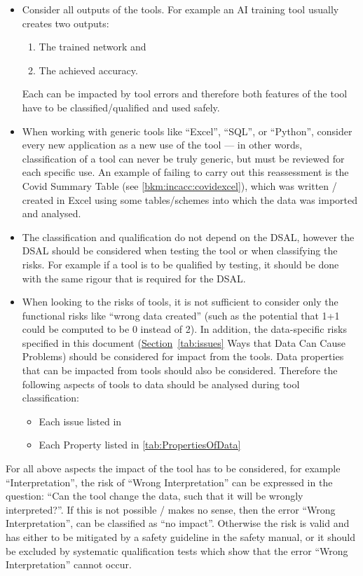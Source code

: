 \begin{itemize}
\item Consider all outputs of the tools.
  For example an AI training tool usually creates two outputs:
  \begin{enumerate}
  \item The trained network and
  \item The achieved accuracy.
  \end{enumerate}
  Each can be impacted by tool errors and therefore both features of the tool have to be classified/qualified  and used safely.
\item When working with generic tools like ``Excel'', ``SQL'', or ``Python'',
consider every new application as a new use of the tool --- in other words, classification of a tool can never be truly generic, but must be reviewed for each specific use. 
  An example of failing to carry out this reassessment is the Covid Summary Table (see \autoref{bkm:incacc:covidexcel}),
  which was written / created in Excel using some tables/schemes into which the data was imported and analysed.
\item The classification and qualification do not depend on the DSAL, however the DSAL should be considered when testing the tool or when classifying the risks.
  For example if a tool is to be qualified by testing, it should be done with the same rigour that is required  for the DSAL. 
\item When looking to the risks of tools, it is not sufficient to consider only the functional risks like ``wrong data created''
  (such as the potential that 1+1 could be computed to be 0 instead of 2).
  In addition, the data-specific risks specified in this document
  (\hyperref[tab:issues]{Section}~\ref{tab:issues} Ways that Data Can Cause  Problems) should be considered for impact from the tools.
  Data properties that can be impacted from tools should also be considered.
  Therefore the following aspects of tools to data should be analysed during tool classification:
  \begin{itemize}
  \item Each issue listed in 
  \item Each Property listed in \autoref{tab:PropertiesOfData}
  \end{itemize}    
\end{itemize}

For all above aspects the impact of the tool has to be considered, for example ``Interpretation'',
the risk of ``Wrong Interpretation'' can be expressed in the question:
``Can the tool change the data, such that it will be wrongly interpreted?''.
If this is not possible / makes no sense, then the error ``Wrong Interpretation'', can be classified as ``no impact''.
Otherwise the risk is valid and has either to be mitigated by a safety guideline in the safety manual,
or it should be excluded by systematic qualification  tests which show that the error ``Wrong Interpretation'' cannot occur.  
